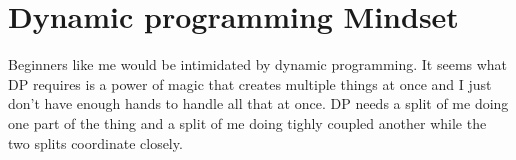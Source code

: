 
\chapter{Dynamic programming Mindset} \label{ch:dp}

Beginners like me would be intimidated by dynamic programming.
It seems what DP requires is a power of magic that creates multiple things at once and I just don't
have enough hands to handle all that at once.
DP needs a split of me doing one part of the thing and a split of me doing tighly coupled another
while the two splits coordinate closely.
